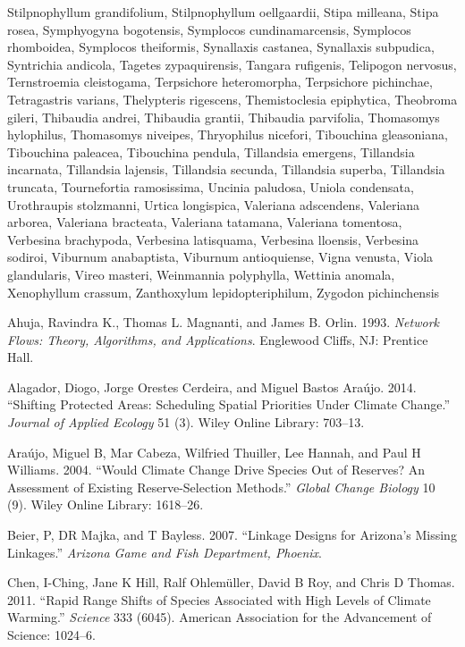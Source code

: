 \documentclass[]{article}
\begin{document}
Stilpnophyllum grandifolium, Stilpnophyllum oellgaardii, Stipa milleana, Stipa rosea, Symphyogyna bogotensis, Symplocos cundinamarcensis, Symplocos rhomboidea, Symplocos theiformis, Synallaxis castanea, Synallaxis subpudica, Syntrichia andicola, Tagetes zypaquirensis, Tangara rufigenis, Telipogon nervosus, Ternstroemia cleistogama, Terpsichore heteromorpha, Terpsichore pichinchae, Tetragastris varians, Thelypteris rigescens, Themistoclesia epiphytica, Theobroma gileri, Thibaudia andrei, Thibaudia grantii, Thibaudia parvifolia, Thomasomys hylophilus, Thomasomys niveipes, Thryophilus nicefori, Tibouchina gleasoniana, Tibouchina paleacea, Tibouchina pendula, Tillandsia emergens, Tillandsia incarnata, Tillandsia lajensis, Tillandsia secunda, Tillandsia superba, Tillandsia truncata, Tournefortia ramosissima, Uncinia paludosa, Uniola condensata, Urothraupis stolzmanni, Urtica longispica, Valeriana adscendens, Valeriana arborea, Valeriana bracteata, Valeriana tatamana, Valeriana tomentosa, Verbesina brachypoda, Verbesina latisquama, Verbesina lloensis, Verbesina sodiroi, Viburnum anabaptista, Viburnum antioquiense, Vigna venusta, Viola glandularis, Vireo masteri, Weinmannia polyphylla, Wettinia anomala, Xenophyllum crassum, Zanthoxylum lepidopteriphilum, Zygodon pichinchensis

\hypertarget{refs}{}
\leavevmode\hypertarget{ref-Ahuja93}{}%
Ahuja, Ravindra K., Thomas L. Magnanti, and James B. Orlin. 1993. \emph{Network Flows: Theory, Algorithms, and Applications}. Englewood Cliffs, NJ: Prentice Hall.

\leavevmode\hypertarget{ref-alagador2014shifting}{}%
Alagador, Diogo, Jorge Orestes Cerdeira, and Miguel Bastos Araújo. 2014. ``Shifting Protected Areas: Scheduling Spatial Priorities Under Climate Change.'' \emph{Journal of Applied Ecology} 51 (3). Wiley Online Library: 703--13.

\leavevmode\hypertarget{ref-araujo2004would}{}%
Araújo, Miguel B, Mar Cabeza, Wilfried Thuiller, Lee Hannah, and Paul H Williams. 2004. ``Would Climate Change Drive Species Out of Reserves? An Assessment of Existing Reserve-Selection Methods.'' \emph{Global Change Biology} 10 (9). Wiley Online Library: 1618--26.

\leavevmode\hypertarget{ref-beier2007linkage}{}%
Beier, P, DR Majka, and T Bayless. 2007. ``Linkage Designs for Arizona's Missing Linkages.'' \emph{Arizona Game and Fish Department, Phoenix}.

\leavevmode\hypertarget{ref-chen2011rapid}{}%
Chen, I-Ching, Jane K Hill, Ralf Ohlemüller, David B Roy, and Chris D Thomas. 2011. ``Rapid Range Shifts of Species Associated with High Levels of Climate Warming.'' \emph{Science} 333 (6045). American Association for the Advancement of Science: 1024--6.
\end{document}

